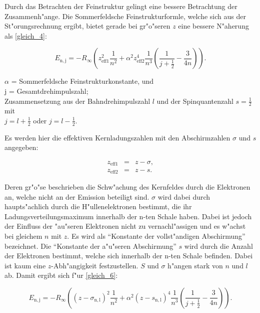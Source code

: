 		Durch das Betrachten der Feinstruktur gelingt eine bessere Betrachtung der Zu\-sam\-men\-h"an\-ge.
		Die Sommerfeldsche Feinstrukturformle, welche sich aus der St"orungsrechnung ergibt, bietet gerade bei gr"o"seren $z$ eine bessere N"aherung als \eqref{gleich_4}:

		\begin{equation}
			E_\mathrm{n,j} = -R_\infty \left(z_\mathrm{eff1}^2 \frac{1}{n^2} + \alpha^2 z_\mathrm{eff2}^4 \frac{1}{n^3} \left( \frac{1}{j + \frac{1}{2}} - \frac{3}{4n} \right) \right).\label{gleich_6}
		\end{equation}
		\begin{center}
			$\alpha$ = Sommerfeldsche Feinstrukturkonstante, und\\
			j = Gesamtdrehimpulszahl; \\
			Zusammensetzung aus der Bahndrehimpulszahl $l$ und der Spinquantenzahl $s = \frac{1}{2}$ mit\\
			$j = l + \frac{1}{2}$ oder $j = l - \frac{1}{2}$.
		\end{center}

		Es werden hier die effektiven Kernladungszahlen mit den Abschirmzahlen $\sigma$ und $s$ angegeben:

		\begin{eqnarray*}
			z_\mathrm{eff1} &=& z - \sigma,\\
			z_\mathrm{eff2} &=& z - s.
		\end{eqnarray*}

		Deren gr"o"se beschrieben die Schw"achung des Kernfeldes durch die Elektronen an, welche nicht an der Emission beteiligt sind.
		$\sigma$ wird dabei durch haupts"achlich durch die H"ul\-len\-e\-lek\-tro\-nen bestimmt, die ihr Ladungsverteilungsmaximum innerhalb der n-ten Schale haben.
		Dabei ist jedoch der Einfluss der "au"seren Elektronen nicht zu vernachl"assigen und es w"achst bei gleichem $n$ mit $z$.
		Es wird als "`Konstante der vollst"andigen Abschirmung"' bezeichnet.
		Die "`Konstante der a"u"seren Abschirmung"' $s$ wird durch die Anzahl der Elektronen bestimmt, welche sich innerhalb der n-ten Schale befinden.
		Dabei ist kaum eine $z$-Ab\-h"an\-gig\-keit festzustellen.
		$S$ und $\sigma$ h"angen stark von $n$ und $l$ ab.
		Damit ergibt sich f"ur \eqref{gleich_6}:

		\begin{equation}
			E_\mathrm{n,j} = -R_\infty \left( (z - \sigma_\mathrm{n,l})^2 \frac{1}{n^2} + \alpha^2 (z - s_\mathrm{n,l})^4 \frac{1}{n^3} \left( \frac{1}{j + \frac{1}{2}} - \frac{3}{4n} \right) \right). \label{gleich_7}
		\end{equation}

